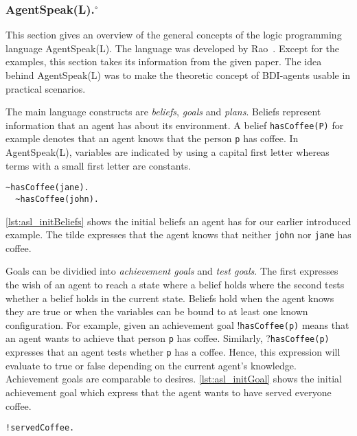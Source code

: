 \subsubsection[AgentSpeak(L).]{AgentSpeak(L).$^\circ$}
This section gives an overview of the general concepts of the logic programming language AgentSpeak(L). The language was developed by Rao~\cite{rao_agentspeak_1996}. Except for the examples, this section takes its information from the given paper. The idea behind AgentSpeak(L) was to make the theoretic concept of BDI-agents usable in practical scenarios. %

The main language constructs are \emph{beliefs}, \emph{goals} and \emph{plans}. Beliefs represent information that an agent has about its environment. A belief \texttt{hasCoffee(P)} for example denotes that an agent knows that the person \texttt{p} has coffee. In AgentSpeak(L), variables are indicated by using a capital first letter whereas terms with a small first letter are constants. %
\begin{lstlisting}[caption={Initial beliefs.}, label=lst:asl_initBeliefs]
  ~hasCoffee(jane).
  ~hasCoffee(john).
\end{lstlisting}
\autoref{lst:asl_initBeliefs} shows the initial beliefs an agent has for our earlier introduced example. The tilde expresses that the agent knows that neither \texttt{john} nor \texttt{jane} has coffee. %

Goals can be dividied into \emph{achievement goals} and \emph{test goals}. The first expresses the wish of an agent to reach a state where a belief holds where the second tests whether a belief holds in the current state. Beliefs hold when the agent knows they are true or when the variables can be bound to at least one known configuration. For example, given an achievement goal !\texttt{hasCoffee(p)} means that an agent wants to achieve that person \texttt{p} has coffee. Similarly, ?\texttt{hasCoffee(p)} expresses that an agent tests whether \texttt{p} has a coffee. Hence, this expression will evaluate to true or false depending on the current agent's knowledge.
Achievement goals are comparable to desires. %
\autoref{lst:asl_initGoal} shows the initial achievement goal which express that the agent wants to have served everyone coffee.
\begin{lstlisting}[firstnumber=3, caption={Initial goal.}, label=lst:asl_initGoal]
  !servedCoffee.
\end{lstlisting}

